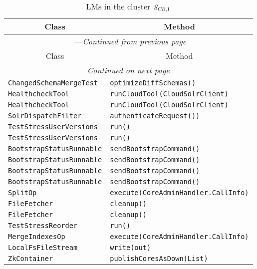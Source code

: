\begin{center}
\begin{longtable}{ll}
\caption{LMs in the cluster $\mathit{S}_{\mathit{CB},1}$}\\
\toprule\multicolumn{1}{c}{Class}&\multicolumn{1}{c}{Method}\\\midrule
\endfirsthead

\multicolumn{2}{c}{\tablename\ \thetable{}---\textit{Continued from previous page}} \\\midrule
\multicolumn{1}{c}{Class}&\multicolumn{1}{c}{Method}\\\midrule
\endhead
\multicolumn{2}{c}{\textit{Continued on next page}}\\\midrule
\endfoot
\bottomrule
\endlastfoot

\lstinline/ChangedSchemaMergeTest/&{\lstinline/optimizeDiffSchemas()/}\\
\lstinline/HealthcheckTool/&{\lstinline/runCloudTool(CloudSolrClient)/}\\
\lstinline/HealthcheckTool/&{\lstinline/runCloudTool(CloudSolrClient)/}\\
\lstinline/SolrDispatchFilter/&{\lstinline/authenticateRequest())/}\\
\lstinline/TestStressUserVersions/&{\lstinline/run()/}\\
\lstinline/TestStressUserVersions/&{\lstinline/run()/}\\
\lstinline/BootstrapStatusRunnable/&{\lstinline/sendBootstrapCommand()/}\\
\lstinline/BootstrapStatusRunnable/&{\lstinline/sendBootstrapCommand()/}\\
\lstinline/BootstrapStatusRunnable/&{\lstinline/sendBootstrapCommand()/}\\
\lstinline/BootstrapStatusRunnable/&{\lstinline/sendBootstrapCommand()/}\\
\lstinline/SplitOp/&{\lstinline/execute(CoreAdminHandler.CallInfo)/}\\
\lstinline/FileFetcher/&{\lstinline/cleanup()/}\\
\lstinline/FileFetcher/&{\lstinline/cleanup()/}\\
\lstinline/TestStressReorder/&{\lstinline/run()/}\\
\lstinline/MergeIndexesOp/&{\lstinline/execute(CoreAdminHandler.CallInfo)/}\\
\lstinline/LocalFsFileStream/&{\lstinline/write(out)/}\\
\lstinline/ZkContainer/&{\lstinline/publishCoresAsDown(List)/}\\

\end{longtable}
\end{center}
